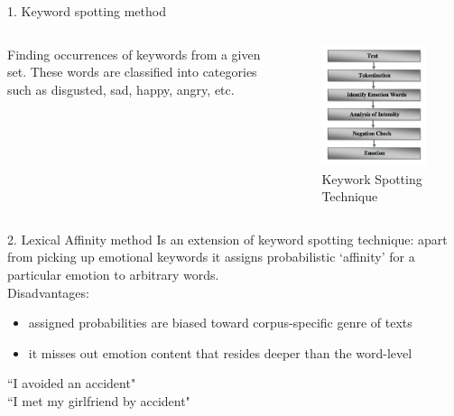 \documentclass[xcolor=dvipsnames]{beamer}
\begin{document}
\begin{frame}{1. Keyword spotting method}
\begin{columns}
Finding occurrences of keywords from a given set. These words are classified into categories such as disgusted, sad, happy, angry, etc. 
\begin{figure}
	\centering
	\includegraphics[scale=0.45]{./images/keyword_spotting}
	\caption{Keywork Spotting Technique}
\end{figure}
\end{columns}
\end{frame}

\begin{frame}{2. Lexical Affinity method}
Is an extension of keyword spotting technique: apart from picking up emotional keywords it assigns  probabilistic `affinity' for a particular emotion to arbitrary words.\\
Disadvantages: 
\begin{itemize}
\item assigned probabilities are biased toward corpus-specific genre of texts
\item it misses out emotion content that resides deeper than the word-level
\end{itemize}
\begin{example}
``I avoided an accident"\\
``I met my girlfriend by accident"
\end{example}
\end{frame}
\end{document}
